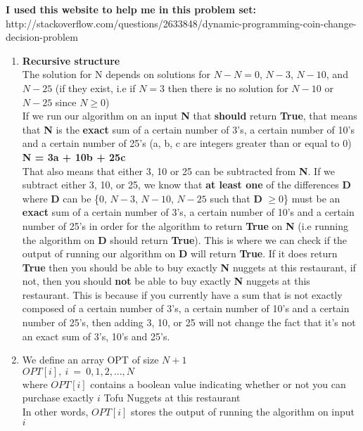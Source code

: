 \documentclass[11pt,twoside]{article}
\begin{document}
{\bf I used this website to help me in this problem set:}\\ http://stackoverflow.com/questions/2633848/dynamic-programming-coin-change-decision-problem
\begin{enumerate}[leftmargin=0pt,label=(\alph*)]

\item {\bf Recursive structure}\\
The solution for N depends on solutions for $N-N=0$, $N-3$, $N-10$, and $N-25$ (if they exist, i.e if $N=3$ then there is no solution for $N-10$ or $N-25$ since $N\geq0$)\\
If we run our algorithm on an input {\bf N} that {\bf should} return {\bf True}, that means that {\bf N} is the {\bf exact} sum of a certain number of 3's, a certain number of 10's and a certain number of 25's (a, b, c are integers greater than or equal to 0) {\bf N = 3a + 10b + 25c}\\
That also means that either 3, 10 or 25 can be subtracted from {\bf N}. If we subtract either 3, 10, or 25, we know that {\bf at least one} of the differences {\bf D} where {\bf D} can be \{$0$, $N-3$, $N-10$, $N-25$ such that {\bf D} $\geq0$\} must be an {\bf exact} sum of a certain number of 3's, a certain number of 10's and a certain number of 25's in order for the algorithm to return {\bf True} on {\bf N} (i.e running the algorithm on {\bf D} should return {\bf True}). This is where we can check if the output of running our algorithm on {\bf D} will return {\bf True}. If it does return {\bf True} then you should be able to buy exactly {\bf N} nuggets at this restaurant, if not, then you should {\bf not} be able to buy exactly {\bf N} nuggets at this restaurant. This is because if you currently have a sum that is not exactly composed of a certain number of 3's, a certain number of 10's and a certain number of 25's, then adding 3, 10, or 25 will not change the fact that it's not an exact sum of 3's, 10's and 25's.

\item We define an array OPT of size $N+1$\\
$OPT[i],\ i\ =\ 0,1,2,...,N$\\
where $OPT[i]$ contains a boolean value indicating whether or not you can purchase exactly $i$ Tofu Nuggets at this restaurant\\
In other words, $OPT[i]$ stores the output of running the algorithm on input $i$


\end{enumerate}
\end{document}
